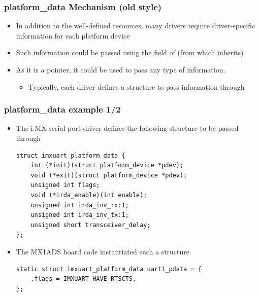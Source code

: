 \begin{frame}
  \frametitle{platform\_data Mechanism (old style)}
  \begin{itemize}
  \item In addition to the well-defined resources, many drivers
    require driver-specific information for each platform device
  \item Such information could be passed using the 
    field of  (from which
     inherits)
  \item As it is a  pointer, it could be used to pass any
    type of information.
    \begin{itemize}
    \item Typically, each driver defines a structure to pass
      information through 
    \end{itemize}
  \end{itemize}
\end{frame}

\begin{frame}[fragile]
  \frametitle{platform\_data example 1/2}
  \begin{itemize}
  \item The i.MX serial port driver defines the following structure to
    be passed through 
    \begin{block}{}
  \begin{verbatim}
struct imxuart_platform_data {
    int (*init)(struct platform_device *pdev);
    void (*exit)(struct platform_device *pdev);
    unsigned int flags;
    void (*irda_enable)(int enable);
    unsigned int irda_inv_rx:1;
    unsigned int irda_inv_tx:1;
    unsigned short transceiver_delay;
};
  \end{verbatim}
  \end{block}
  \item The MX1ADS board code instantiated such a structure
    \begin{block}{}
  \begin{verbatim}
static struct imxuart_platform_data uart1_pdata = {
    .flags = IMXUART_HAVE_RTSCTS,
};
  \end{verbatim}
  \end{block}
  \end{itemize}
\end{frame}

